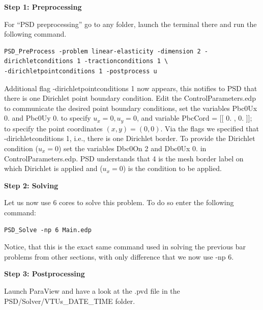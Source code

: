 {{\textbf{Step 1: Preprocessing}

For ``PSD preprocessing'' go to any folder, launch the terminal there and run the following command.
\begin{lstlisting}[style=BashInputStyle]
PSD_PreProcess -problem linear-elasticity -dimension 2 -dirichletconditions 1 -tractionconditions 1 \
-dirichletpointconditions 1 -postprocess u
\end{lstlisting}

Additional flag {\ttfamily -dirichletpointconditions 1} now appears, this notifies to PSD that there is one Dirichlet point boundary condition. Edit the  {\ttfamily ControlParameters.edp} to communicate the desired point boundary conditions, set the variables {\ttfamily Pbc0Ux  0.} and {\ttfamily Pbc0Uy  0.} to specify $u_x=0,u_y=0$, and variable {\ttfamily PbcCord = [[  0. , 0. ]];} to specify the point coordinates $(x,y)=(0,0)$. Via the flags we specified that {\ttfamily -dirichletconditions 1}, i.e., there is one Dirichlet border.
To provide the Dirichlet condition ($u_x=0$) set the variables {\ttfamily Dbc0On 2} and {\ttfamily Dbc0Ux 0.}  in {\ttfamily ControlParameters.edp}. PSD understands that 4 is the mesh border label on which Dirichlet is applied and ($u_x=0$) is the condition to be applied.

\textbf{Step 2: Solving}

Let us now use 6 cores to solve this problem. To do so enter the following command:

\begin{lstlisting}[style=BashInputStyle]
PSD_Solve -np 6 Main.edp
\end{lstlisting}
%
Notice, that this is the exact same command used in solving the previous bar problems from other sections, with only difference that we now use {\ttfamily -np 6}.


\textbf{Step 3: Postprocessing}

Launch ParaView and have a look at the  {\ttfamily .pvd} file in the  {\ttfamily PSD/Solver/VTUs\_DATE\_TIME} folder. 

}}
